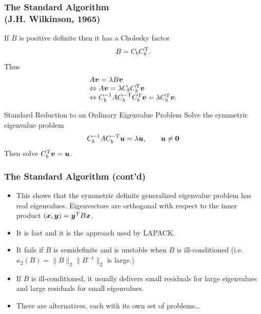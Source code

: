 \documentclass[landscape]{beamer}
\renewcommand{\vec}[1]{\bm{#1}}
\newcommand{\T}{{\rm T}}
\begin{document}
\begin{frame}
  \frametitle{The Standard Algorithm\\
    (J.H. Wilkinson, 1965)}
  
  If $B$ is positive definite then it has a Cholesky factor
  \begin{equation*}
    B = C_b C_b^\T.
  \end{equation*}
  Thus
  \begin{equation*}
    \begin{array}{l}
      A \vec{v} = \lambda B\vec{v} \\
      \Leftrightarrow A \vec{v} = \lambda C_b C_b^\T \vec{v} \\
      \Leftrightarrow C_b^{-1} A C_b^{-\T} C_b^\T \vec{v} = \lambda C_b^{\T} \vec{v}.
    \end{array}
  \end{equation*}

  \begin{block}{Standard Reduction to an Ordinary Eigenvalue Problem}
    Solve the symmetric eigenvalue problem
    \begin{equation*}
      C_b^{-1} A C_b^{-\T} \vec{u} = \lambda \vec{u}, \qquad \vec{u} \neq \vec{0}
    \end{equation*}
    Then solve $C_b^\T\vec{v} = \vec{u}$.
  \end{block}
\end{frame}

\begin{frame}
  \frametitle{The Standard Algorithm (cont'd)}

  \begin{itemize}
  \item This shows that the symmetric definite generalized eigenvalue
    problem has real eigenvalues.  Eigenvectors are orthogonal with
    respect to the inner product
    $(\vec{x}, \vec{y}) = \vec{y}^\T B \vec{x}$.
  \item It is fast and it is the approach used by LAPACK.
  \item It fails if $B$ is semidefinite and is unstable when $B$ is
    ill-conditioned (i.e. $\kappa_2(B) = \|B\|_2\|B^{-1}\|_2$ is
    large.)
  \item If $B$ is ill-conditioned, it usually delivers small residuals for large eigenvalues and large residuals for small eigenvalues. 
  \item There are alternatives, each with its own set of problems\ldots
  \end{itemize}
\end{frame}
\end{document}
